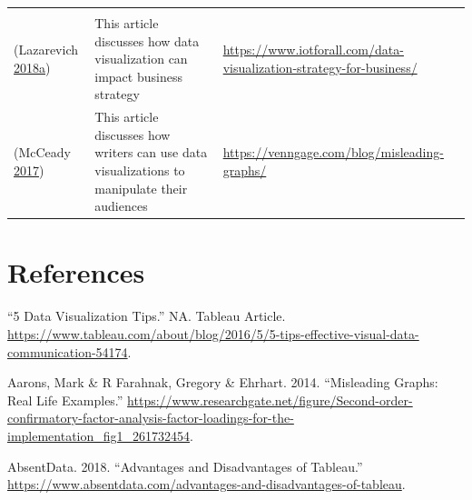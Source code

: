 \documentclass[]{book}
\begin{document}
\begin{longtable}[]{@{}lll@{}}
\begin{minipage}[t]{0.48\columnwidth}
\end{minipage}\tabularnewline
\begin{minipage}[t]{0.15\columnwidth}\raggedright\strut
(Lazarevich
\protect\hyperlink{ref-strategy_impact}{2018}\protect\hyperlink{ref-strategy_impact}{a})\strut
\end{minipage} & \begin{minipage}[t]{0.28\columnwidth}\raggedright\strut
This article discusses how data visualization can impact business
strategy\strut
\end{minipage} & \begin{minipage}[t]{0.48\columnwidth}\raggedright\strut
\url{https://www.iotforall.com/data-visualization-strategy-for-business/}\strut
\end{minipage}\tabularnewline
\begin{minipage}[t]{0.15\columnwidth}\raggedright\strut
(McCeady \protect\hyperlink{ref-writers_manipulate}{2017})\strut
\end{minipage} & \begin{minipage}[t]{0.28\columnwidth}\raggedright\strut
This article discusses how writers can use data visualizations to
manipulate their audiences\strut
\end{minipage} & \begin{minipage}[t]{0.48\columnwidth}\raggedright\strut
\url{https://venngage.com/blog/misleading-graphs/}\strut
\end{minipage}\tabularnewline
\bottomrule
\end{longtable}

\chapter*{References}\label{references-1}

\hypertarget{refs}{}
\hypertarget{ref-DataVizTips}{}
``5 Data Visualization Tips.'' NA. Tableau Article.
\url{https://www.tableau.com/about/blog/2016/5/5-tips-effective-visual-data-communication-54174}.

\hypertarget{ref-aarons_2014}{}
Aarons, Mark \& R Farahnak, Gregory \& Ehrhart. 2014. ``Misleading
Graphs: Real Life Examples.''
\url{https://www.researchgate.net/figure/Second-order-confirmatory-factor-analysis-factor-loadings-for-the-implementation_fig1_261732454}.

\hypertarget{ref-tableau_interactive_viz}{}
AbsentData. 2018. ``Advantages and Disadvantages of Tableau.''
\url{https://www.absentdata.com/advantages-and-disadvantages-of-tableau}.
\end{document}
